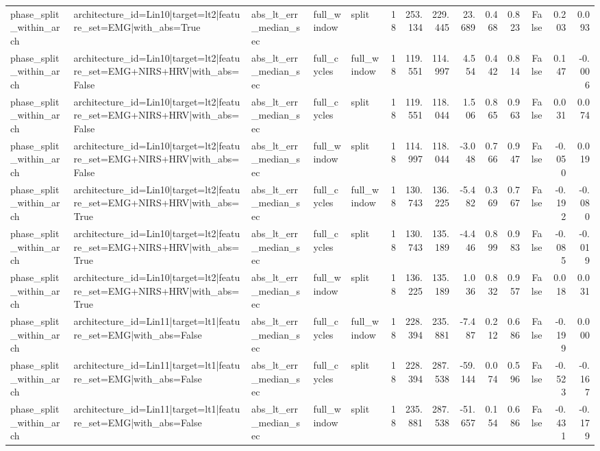 \begin{table}
\begin{tabular}{lllllrrrrrrrrr}
phase_split_within_arch & architecture_id=Lin10|target=lt2|feature_set=EMG|with_abs=True & abs_lt_err_median_sec & full_window & split & 18 & 253.134 & 229.445 & 23.689 & 0.468 & 0.823 & False & 0.203 & 0.093 \\
phase_split_within_arch & architecture_id=Lin10|target=lt2|feature_set=EMG+NIRS+HRV|with_abs=False & abs_lt_err_median_sec & full_cycles & full_window & 18 & 119.551 & 114.997 & 4.554 & 0.442 & 0.814 & False & 0.147 & -0.006 \\
phase_split_within_arch & architecture_id=Lin10|target=lt2|feature_set=EMG+NIRS+HRV|with_abs=False & abs_lt_err_median_sec & full_cycles & split & 18 & 119.551 & 118.044 & 1.506 & 0.865 & 0.963 & False & 0.031 & 0.074 \\
phase_split_within_arch & architecture_id=Lin10|target=lt2|feature_set=EMG+NIRS+HRV|with_abs=False & abs_lt_err_median_sec & full_window & split & 18 & 114.997 & 118.044 & -3.048 & 0.766 & 0.947 & False & -0.050 & 0.019 \\
phase_split_within_arch & architecture_id=Lin10|target=lt2|feature_set=EMG+NIRS+HRV|with_abs=True & abs_lt_err_median_sec & full_cycles & full_window & 18 & 130.743 & 136.225 & -5.482 & 0.369 & 0.767 & False & -0.192 & -0.080 \\
phase_split_within_arch & architecture_id=Lin10|target=lt2|feature_set=EMG+NIRS+HRV|with_abs=True & abs_lt_err_median_sec & full_cycles & split & 18 & 130.743 & 135.189 & -4.446 & 0.899 & 0.983 & False & -0.085 & -0.019 \\
phase_split_within_arch & architecture_id=Lin10|target=lt2|feature_set=EMG+NIRS+HRV|with_abs=True & abs_lt_err_median_sec & full_window & split & 18 & 136.225 & 135.189 & 1.036 & 0.832 & 0.957 & False & 0.018 & 0.031 \\
phase_split_within_arch & architecture_id=Lin11|target=lt1|feature_set=EMG|with_abs=False & abs_lt_err_median_sec & full_cycles & full_window & 18 & 228.394 & 235.881 & -7.487 & 0.212 & 0.686 & False & -0.199 & 0.000 \\
phase_split_within_arch & architecture_id=Lin11|target=lt1|feature_set=EMG|with_abs=False & abs_lt_err_median_sec & full_cycles & split & 18 & 228.394 & 287.538 & -59.144 & 0.074 & 0.596 & False & -0.523 & -0.167 \\
phase_split_within_arch & architecture_id=Lin11|target=lt1|feature_set=EMG|with_abs=False & abs_lt_err_median_sec & full_window & split & 18 & 235.881 & 287.538 & -51.657 & 0.154 & 0.686 & False & -0.431 & -0.179 \\

\end{tabular}
\end{table}
